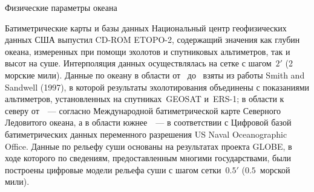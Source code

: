 \begin{chapter}{Физические параметры океана}
\begin{section}{Батиметрические карты и базы данных}
Национальный центр геофизических данных США выпустил CD-ROM
ETOPO-2, содержащий значения как глубин океана, измеренных при помощи эхолотов
и спутниковых альтиметров, так и высот на суше.
Интерполяция данных осуществлялась на сетке с шагом~$2'$ (2 морские мили).
Данные по океану в области от~ до~ взяты из
работы Smith and Sandwell (1997), в которой результаты эхолотирования
объединены с показаниями альтиметров, установленных на спутниках~GEOSAT
и~ERS-1; в области к северу от~~--- согласно Международной
батиметрической карте Северного Ледовитого океана, а в области 
южнее~~--- в соответствии с Цифровой базой батиметрических
данных переменного разрешения US Naval Oceanographic Office.
Данные по рельефу суши основаны на результатах проекта GLOBE, в ходе которого 
по сведениям, предоставленным многими государствами, были построены
цифровые модели рельефа суши с шагом сетки~$0.5'$ ($0.5$~морской мили).
%




\end{section}
\end{chapter}
